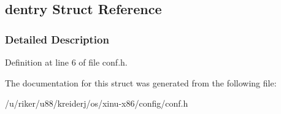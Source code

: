 \hypertarget{structdentry}{}\subsection{dentry Struct Reference}
\label{structdentry}


\subsubsection{Detailed Description}


Definition at line 6 of file conf.\+h.



The documentation for this struct was generated from the following file\+:\begin{DoxyCompactItemize}
\item 
/u/riker/u88/kreiderj/os/xinu-\/x86/config/conf.\+h\end{DoxyCompactItemize}
